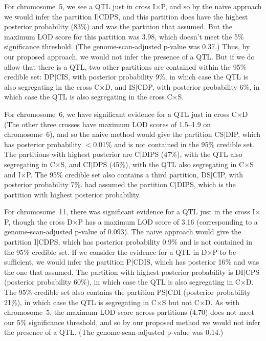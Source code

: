 \documentclass[12pt,letterpaper]{article}
\begin{document}
For chromosome~5, we see a QTL just in cross I$\times$P, and so by the naive
approach we would infer the partition I$|$CDPS, and this partition
does have the highest posterior probability (83\%) and was the
partition that \citet{Li2005} assumed.  But the maximum
LOD score for this partition was 3.98, which doesn't meet the 5\%
significance threshold. (The genome-scan-adjusted p-value was 0.37.)
Thus, by our proposed approach, we would not infer the presence of a
QTL.  But if we do allow that there is a QTL, two other partitions are
contained within the 95\% credible set: DP$|$CIS, with posterior
probability 9\%, in which case the QTL is also segregating in the
cross C$\times$D, and IS$|$CDP, with posterior probability 6\%, in
which case the QTL is also segregating in the
cross C$\times$S. 

For chromosome~6, we have significant evidence for a QTL just in cross
C$\times$D (The other three crosses have maximum LOD scores of 1.5--1.9 on
chromosome~6), and so the naive method
would give the partition CS$|$DIP, which has posterior probability
$<$0.01\% and is not contained in the 95\% credible set.  The
partitions with highest posterior are C$|$DIPS (47\%), with the QTL also
segregating in C$\times$S, and CI$|$DPS (45\%), with the QTL also
segregating in C$\times$S and
I$\times$P.  The 95\% credible set also contains a third partition,
DS$|$CIP, with posterior probability 7\%.
\citet{Li2005} had assumed the partition C$|$DIPS, which is the
partition with highest posterior probability.

For chromosome~11, there was significant evidence for a QTL just in the cross
I$\times$P, though the cross D$\times$P has a maximum LOD score of
3.16 (corresponding to a genome-scan-adjusted p-value of 0.093).  The
naive approach would give the partition I$|$CDPS, which has posterior
probability 0.9\% and is not contained in the 95\% credible set.  If
we consider the evidence for a QTL in D$\times$P to be sufficient, we
would infer the partition P$|$CDIS, which has posterior 16\% and was
the one that \citet{Li2005} assumed.  The
partition with highest posterior probability is DI$|$CPS (posterior probability
60\%), in which case the QTL is also segregating in C$\times$D.  The
95\% credible set also contains the partition PS$|$CDI (posterior
probability 21\%), in which case the QTL is segregating in C$\times$S
but not C$\times$D.  As with chromosome~5, the maximum LOD score across
partitions (4.70) does not meet our 5\% significance threshold, and so
by our proposed method we would not infer the presence of a QTL.  (The
genome-scan-adjusted p-value was 0.14.)  
\end{document}
